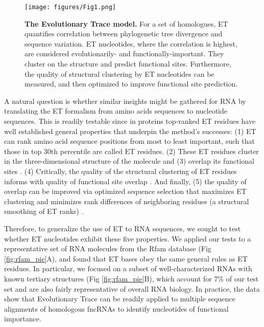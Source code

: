 \documentclass[12pt,a4paper]{report}
\begin{document}
\begin{figure}
\begin{minipage}[c][\textheight]{\textwidth}
\vspace*{-2.5in}
  \texttt{[image: figures/Fig1.png]}
  \caption[The Evolutionary Trace model.]{\textbf{The Evolutionary Trace model.} For a set of homologues, ET quantifies correlation between phylogenetic tree divergence and sequence variation. ET nucleotides, where the correlation is highest, are considered evolutionarily- and functionally-important. They cluster on the structure and predict functional sites. Furthermore, the quality of structural clustering by ET nucleotides can be measured, and then optimized to improve functional site prediction.}
  \label{fig:et_model}
\end{minipage}
\end{figure}



A natural question is whether similar insights might be gathered for RNA by translating the ET formalism from amino acids sequences to nucleotide sequences. This is readily testable since in proteins top-ranked ET residues have well established general properties that underpin the method’s successes: (1) ET can rank amino acid sequence positions from most to least important, such that those in top 30th percentile are called ET residues. (2) These ET residues cluster in the three-dimensional structure of the molecule \cite{Madabushi2002} and (3) overlap its functional sites \cite{Lichtarge2003}. (4) Critically, the quality of the structural clustering of ET residues informs with quality of functional site overlap \cite{Mihalek2006-1}. And finally, (5) the quality of overlap can be improved via optimized sequence selection that maximizes ET clustering \cite{Mihalek2006-1} and minimizes rank differences of neighboring residues (a structural smoothing of ET ranks) \cite{Wilkins2013}. 

Therefore, to generalize the use of ET to RNA sequences, we sought to test whether ET nucleotides exhibit these five properties. We applied our tests to a representative set of RNA molecules from the Rfam database \cite{Kalvari2018} (Fig \ref{fig:rfam_pie}A), and found that ET bases obey the same general rules as ET residues. In particular, we focused on a subset of well-characterized RNAs with known tertiary structures (Fig \ref{fig:rfam_pie}B), which account for 7\% of our test set and are also fairly representative of overall RNA biology. In practice, the data show that Evolutionary Trace can be readily applied to multiple sequence alignments of homologous fncRNAs to identify nucleotides of functional importance. 
\end{document}
